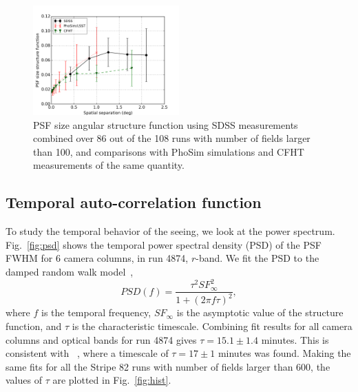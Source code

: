 \begin{figure}
\centering
\includegraphics[width=0.5\textwidth]{FIGURES/spatial.png}
\caption{PSF size angular structure function using SDSS measurements
  combined over 86 out of the 108 runs with number of fields larger
  than 100, and comparisons with PhoSim simulations and CFHT
  measurements of the same quantity.
\label{fig:spatial}}
\end{figure}

\subsection{Temporal auto-correlation function}

To study the temporal behavior of the seeing, we look at the 
 power spectrum.
Fig.~\ref{fig:psd} shows the temporal power spectral density (PSD) of the
PSF FWHM for 6 camera columns, in run 4874, $r$-band.
We fit the PSD to the damped random walk model~\citep{zeljkoBook},
\begin{equation}
PSD(f) = \frac{\tau^2 SF^2_{\infty}}{1+(2\pi f \tau)^2},
\end{equation}
where $f$ is the temporal frequency, $SF_{\infty}$ is the asymptotic
value of the structure function, and $\tau$ is the
characteristic timescale.
Combining fit results for all camera columns and optical bands for run 4874
gives $\tau = 15.1 \pm 1.4$ minutes.
This is consistent with ~\cite{Racine1996}, where a timescale of 
$\tau = 17 \pm 1$ minutes was found.
Making the same fits for all the Stripe 82 runs with number of fields
larger than 600, the values of $\tau$ are plotted in Fig.~\ref{fig:hist}.

